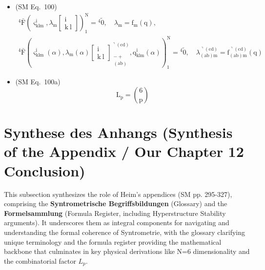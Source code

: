 \documentclass[
    12pt,              %
    a4paper,           %
    headings=normal,   %
    twoside=true,      %
    BCOR=8mm,          %
]{scrbook}
\begin{document}
\begin{itemize}[label={},leftmargin=0pt]
    \item (SM Eq.\ 100) 
    \[
    \begin{gathered}
    {}^4\bar{\mathrm{F}}\left( \varsigma^\mathrm{i}_{\mathrm{klm}}, \lambda_\mathrm{m} \left[ \begin{smallmatrix} \mathrm{i} \\ \mathrm{k\ l} \end{smallmatrix} \right] \right)_1^\mathrm{N} = {}^4\tilde{0}, \quad \lambda_\mathrm{m} = \mathrm{f_m}(\mathrm{q}), \\
    {}^4\bar{\mathrm{F}}\left( \varsigma^\mathrm{i}_{\mathrm{klm}}(\alpha), \lambda_\mathrm{m}(\alpha) \left[ \begin{smallmatrix} \mathrm{i} \\ \mathrm{k\ l} \end{smallmatrix} \right]^{\urcorner(\mathrm{cd})}_{\substack{- + \\ (\mathrm{ab})}}, \mathrm{q}^\mathrm{i}_{\mathrm{klm}}(\alpha) \right)_1^\mathrm{N} = {}^4\tilde{0}, \quad \lambda^{\urcorner(\mathrm{cd})}_{(\mathrm{ab})\mathrm{m}} = \mathrm{f}^{\urcorner(\mathrm{cd})}_{(\mathrm{ab})\mathrm{m}}(\mathrm{q})
    \end{gathered}
    \]

    \item (SM Eq.\ 100a) 
    \[
    \mathrm{L_p} = \binom{6}{\mathrm{p}}
    \]
\end{itemize} 
\section{Synthese des Anhangs (Synthesis of the Appendix / Our Chapter 12 Conclusion)}
\label{sec:appendix_synthesis}
This subsection synthesizes the role of Heim's appendices (SM pp. 295-327), comprising the \textbf{Syntrometrische Begriffsbildungen} (Glossary) and the \textbf{Formelsammlung} (Formula Register, including Hyperstructure Stability arguments). It underscores them as integral components for navigating and understanding the formal coherence of Syntrometrie, with the glossary clarifying unique terminology and the formula register providing the mathematical backbone that culminates in key physical derivations like N=6 dimensionality and the combinatorial factor \(L_p\).
\end{document}
